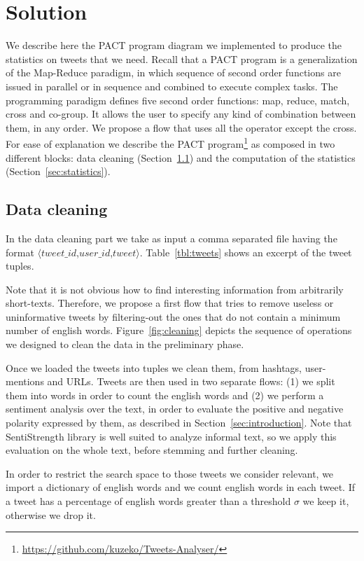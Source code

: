 \section{Solution}
\label{sec:solution}



We describe here the PACT program diagram we implemented to produce the statistics on tweets that we need. 
Recall that a PACT program is a generalization of the Map-Reduce paradigm, in which sequence of second order functions are issued in parallel or in sequence and combined to execute complex tasks. 
The programming paradigm defines five second order functions: map, reduce, match, cross and co-group.
It allows the user to specify any kind of combination between them, in any order.
We propose a flow that uses all the operator except the cross.
For ease of explanation we describe the PACT program\footnote{\url{https://github.com/kuzeko/Tweets-Analyser/}} as composed in two different blocks: data cleaning (Section~\ref{sec:cleaning}) and the computation of the statistics (Section~\ref{sec:statistics}).

\subsection{Data cleaning}
\label{sec:cleaning}
In the data cleaning part we take as input a comma separated file having the format $\langle tweet\_id$,$user\_id$,$tweet \rangle$. 
Table~\ref{tbl:tweets} shows an excerpt of the tweet tuples. 

Note that it is not obvious how to find interesting information from arbitrarily short-texts.
Therefore, we propose a first flow that tries to remove useless or uninformative tweets by filtering-out the ones that do not contain a minimum number of english words. 
Figure~\ref{fig:cleaning} depicts the sequence of operations we designed to clean the data in the preliminary phase. 

Once we loaded the tweets into tuples we clean them, from hashtags, user-mentions and URLs. 
Tweets are then used in two separate flows: (1) we split them into words in order to count the english words and (2) we perform a sentiment analysis over the text, in order to evaluate the positive and negative polarity expressed by them, as described in Section~\ref{sec:introduction}.
Note that SentiStrength library is well suited to analyze informal text, so we apply this evaluation on the whole text, before stemming and further cleaning. 

In order to restrict the search space to those tweets we consider relevant, we import a dictionary of english words and we count english words in each tweet. 
If a tweet has a percentage of english words greater than a threshold $\sigma$ we keep it, otherwise we drop it. 

